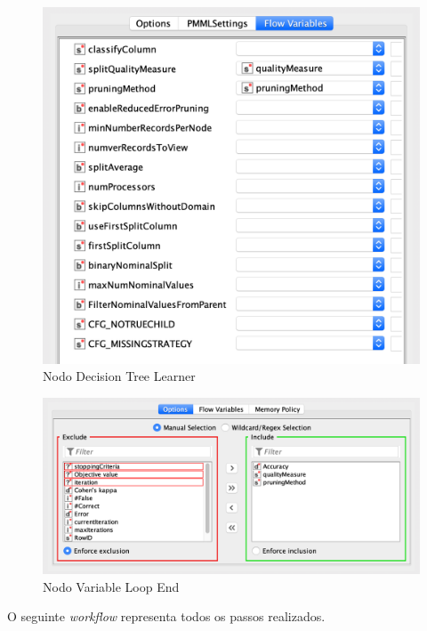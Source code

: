 \begin{figure}[H]
    \centering
    \includegraphics[scale=0.4]{Images/T4_b2.png}
    \caption{Nodo Decision Tree Learner}
\end{figure}

\begin{figure}[H]
    \centering
    \includegraphics[scale=0.4]{Images/T4_b3.png}
    \caption{Nodo Variable Loop End}
\end{figure}

\clearpage

O seguinte \textit{workflow} representa todos os passos realizados.

